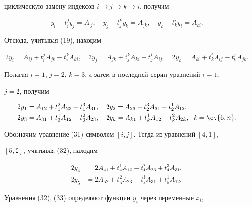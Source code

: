 циклическую замену индексов $i\to j\to k\to i$, получим 


$$ 


y_i-t^j_i y_j=A_{ij},\quad y_j-t^k_j y_k=A_{jk},\quad 


y_k-t^i_k y_i=A_{ki}. 


$$ 


Отсюда, учитывая (19), находим 


$$ 


2y_i=A_{ij}+t^j_i A_{jk}-t^k_i A_{ki},\quad 


2y_j=A_{jk}+t^k_j A_{ki}-t^i_j A_{ij},\quad 


2y_k=A_{ki}+t^i_k A_{ij}-t^j_k A_{jk}. 


$$ 


Полагая $i=1$, $j=2$, $k=3$, а затем в последней серии уравнений $i=1$, 


$j=2$, получим 


\begin{equation} 


\begin{split} 


2y_1&=A_{12}+t^2_1A_{23}-t^3_1A_{31},\quad 


2y_2=A_{23}+t^3_2A_{31}-t^1_2A_{12},\\ 


2y_3&=A_{31}+t^1_3A_{12}-t^2_3A_{23},\quad 


2y_k=A_{k1}+t^1_k A_{12}-t^2_k A_{2k},\ \; k=\ov{6,n}. 


\end{split} 


\end{equation} 


Обозначим уравнение (31) символом $[i,j]$. Тогда из уравнений $[4,1]$, 


$[5,2]$, учитывая (32), находим 


\begin{equation} 


\begin{split} 


2y_4&=2A_{41}+t^1_4A_{12}-t^2_4A_{23}+t^3_4A_{31},\\ 


2y_5&=2A_{52}+t^2_5A_{23}-t^3_5A_{31}+t^1_5A_{12}. 


\end{split} 


\end{equation} 


Уравнения (32), (33) определяют функции $y_i$ через переменные $x_i$, 


